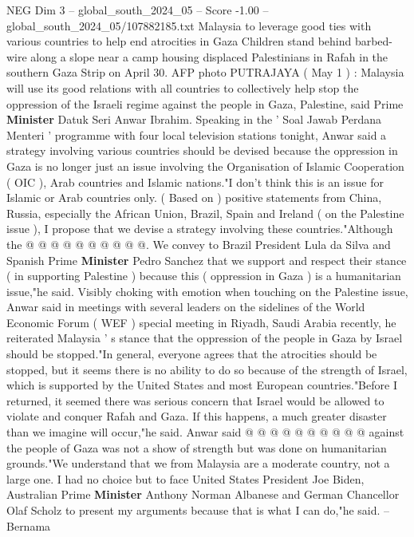 \begin{textsample}{NEG Dim 3 – global\_south\_2024\_05 – Score -1.00 – global\_south\_2024\_05/107882185.txt}  \label{ex:f3_neg_360}
Malaysia to leverage good ties with various countries to help end atrocities in Gaza Children stand behind barbed-wire along a slope near a camp housing displaced Palestinians in Rafah in the southern Gaza Strip on April 30.
AFP photo PUTRAJAYA ( May 1 ) : Malaysia will use its good relations with all countries to collectively help stop the oppression of the Israeli regime against the people in Gaza, Palestine, said Prime \textbf{Minister} Datuk Seri Anwar Ibrahim.
Speaking in the ' Soal Jawab Perdana Menteri ' programme with four local television stations tonight, Anwar said a strategy involving various countries should be devised because the oppression in Gaza is no longer just an issue involving the Organisation of Islamic Cooperation ( OIC ), Arab countries and Islamic nations."I don't think this is an issue for Islamic or Arab countries only. ( Based on ) positive statements from China, Russia, especially the African Union, Brazil, Spain and Ireland ( on the Palestine issue ), I propose that we devise a strategy involving these countries."Although the @ @ @ @ @ @ @ @ @ @.
We convey to Brazil President Lula da Silva and Spanish Prime \textbf{Minister} Pedro Sanchez that we support and respect their stance ( in supporting Palestine ) because this ( oppression in Gaza ) is a humanitarian issue,"he said.
Visibly choking with emotion when touching on the Palestine issue, Anwar said in meetings with several leaders on the sidelines of the World Economic Forum ( WEF ) special meeting in Riyadh, Saudi Arabia recently, he reiterated Malaysia ' s stance that the oppression of the people in Gaza by Israel should be stopped."In general, everyone agrees that the atrocities should be stopped, but it seems there is no ability to do so because of the strength of Israel, which is supported by the United States and most European countries."Before I returned, it seemed there was serious concern that Israel would be allowed to violate and conquer Rafah and Gaza.
If this happens, a much greater disaster than we imagine will occur,"he said.
Anwar said @ @ @ @ @ @ @ @ @ @ against the people of Gaza was not a show of strength but was done on humanitarian grounds."We understand that we from Malaysia are a moderate country, not a large one.
I had no choice but to face United States President Joe Biden, Australian Prime \textbf{Minister} Anthony Norman Albanese and German Chancellor Olaf Scholz to present my arguments because that is what I can do,"he said. -- Bernama

\end{textsample}
